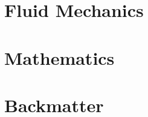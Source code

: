 \usepackage{notation}

\frontmatter
\maketitle

\tableofcontents
\listofpuzzles

\mainmatter
\part{Fluid Mechanics}




\part{Mathematics}



\backmatter
\part*{Backmatter}

\nocite{*}




